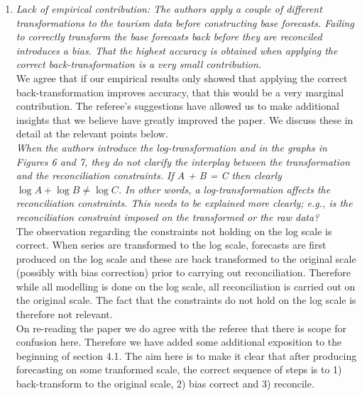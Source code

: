 \documentclass[a4paper,11pt]{article}
\begin{document}
	
	\begin{enumerate}
		
		
		
		\item \textit{Lack of empirical contribution: The authors apply a couple of different transformations to the tourism data before constructing base forecasts. Failing to correctly transform the base forecasts back before they are reconciled introduces a bias. That the highest accuracy is obtained when applying the correct back-transformation is a very small contribution.}\\
		
		We agree that if our empirical results only showed that applying the correct back-transformation improves accuracy, that this would be a very marginal contribution.  The referee's suggestions have allowed us to make additional insights that we believe have greatly improved the paper.  We discuss these in detail at the relevant points below.\\
		
        \textit{When the authors introduce the log-transformation and in the graphs in Figures 6 and 7, they do not clarify the interplay between the transformation and the reconciliation constraints. If A + B = C then clearly $\log A + \log B \neq \log C$. In other words, a log-transformation affects the	reconciliation constraints. This needs to be explained more clearly; e.g., is the reconciliation constraint imposed on the transformed or the raw data?}\\
		
		The observation regarding the constraints not holding on the log scale is correct.  When series are transformed to the log scale, forecasts are first produced on the log scale and these are back transformed to the original scale (possibly with bias correction) prior to carrying out reconciliation.  Therefore while all modelling is done on the log scale, all reconciliation is carried out on the original scale.  The fact that the constraints do not hold on the log scale is therefore not relevant.\\
		
		On re-reading the paper we do agree with the referee that there is scope for confusion here.  Therefore we have added some additional exposition to the beginning of section 4.1.  The aim here is to make it clear that after producing forecasting on some tranformed scale, the correct sequence of steps is to 1) back-transform to the original scale, 2) bias correct and 3) reconcile. \\
		

\end{enumerate}
\end{document}
